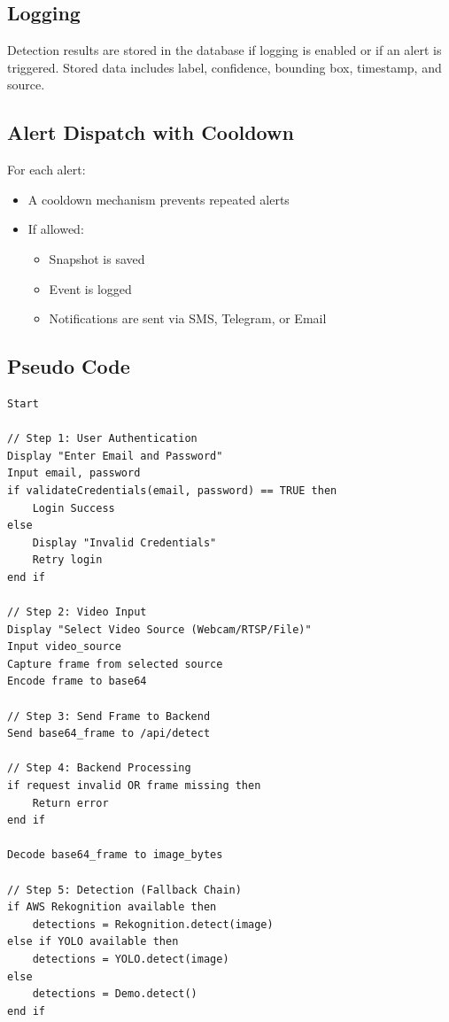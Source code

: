 \documentclass[10pt,openany]{report}
\begin{document}
\begin{sloppypar}
{{{\begin{sloppypar}
\subsection{Logging}
Detection results are stored in the database if logging is enabled or if an alert is triggered. Stored data includes label, confidence, bounding box, timestamp, and source.

\subsection{Alert Dispatch with Cooldown}
For each alert:
\begin{itemize}
    \item A cooldown mechanism prevents repeated alerts
    \item If allowed:
    \begin{itemize}
        \item Snapshot is saved
        \item Event is logged
        \item Notifications are sent via SMS, Telegram, or Email
    \end{itemize}
\end{itemize}

\subsection{Pseudo Code}

\begin{lstlisting}
Start

// Step 1: User Authentication
Display "Enter Email and Password"
Input email, password
if validateCredentials(email, password) == TRUE then
    Login Success
else
    Display "Invalid Credentials"
    Retry login
end if

// Step 2: Video Input
Display "Select Video Source (Webcam/RTSP/File)"
Input video_source
Capture frame from selected source
Encode frame to base64

// Step 3: Send Frame to Backend
Send base64_frame to /api/detect

// Step 4: Backend Processing
if request invalid OR frame missing then
    Return error
end if

Decode base64_frame to image_bytes

// Step 5: Detection (Fallback Chain)
if AWS Rekognition available then
    detections = Rekognition.detect(image)
else if YOLO available then
    detections = YOLO.detect(image)
else
    detections = Demo.detect()
end if


\end{lstlisting}
\end{sloppypar}}}}
\end{sloppypar}
\end{document}
